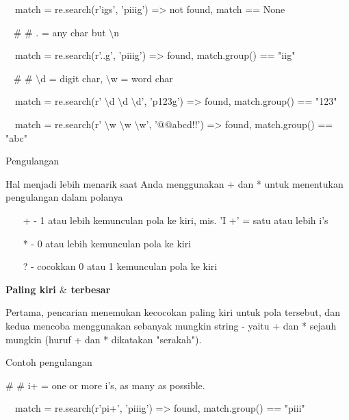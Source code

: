 \begin {enumerate}
\begin {enumerate}
\noindent
~~match = re.search(r'igs', 'piiig') =>  not found, match == None \par
\vspace{12pt}
\noindent
~  $  \#  $ $  \#  $ . = any char but  $  \setminus  $n \par
\noindent
~~match = re.search(r'..g', 'piiig') =>  found, match.group() == "iig" \par
\vspace{12pt}
\noindent
~  $  \#  $ $  \#  $  $  \setminus  $d = digit char,  $  \setminus  $w = word char \par
\noindent
~~match = re.search(r' $  \setminus  $d $  \setminus  $d $  \setminus  $d', 'p123g') =>  found, match.group() == "123" \par
\noindent
~~match = re.search(r' $  \setminus  $w $  \setminus  $w $  \setminus  $w', '@@abcd!!') =>  found, match.group() == "abc" \par
\vspace{12pt}
\vspace{12pt}
\noindent
Pengulangan \par
\vspace{12pt}
\noindent
Hal menjadi lebih menarik saat Anda menggunakan + dan * untuk menentukan pengulangan dalam polanya \par
\vspace{12pt}
\noindent
~~~ + - 1 atau lebih kemunculan pola ke kiri, mis. 'I +' = satu atau lebih i's \par
\noindent
~~~ * - 0 atau lebih kemunculan pola ke kiri \par
\noindent
~~~ ? - cocokkan 0 atau 1 kemunculan pola ke kiri \par
\vspace{12pt}
\vspace{14pt}
\noindent
{\fontsize{14pt}{14pt}\selectfont \textbf{Paling kiri  $  \&  $ terbesar} \\} \par
Pertama, pencarian menemukan kecocokan paling kiri untuk pola tersebut, dan kedua mencoba menggunakan sebanyak mungkin string - yaitu + dan * sejauh mungkin (huruf + dan * dikatakan "serakah"). \par
\noindent
Contoh pengulangan \par
\vspace{12pt}
\noindent
 $  \#  $ $  \#  $ i+ = one or more i's, as many as possible. \par
\noindent
~~match = re.search(r'pi+', 'piiig') =>  found, match.group() == "piii" \par

\end{enumerate}
\end{enumerate}
